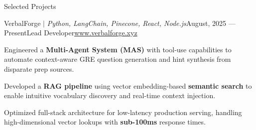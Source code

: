 \begin{rSection}{Selected Projects}

    \begin{rSubsection}{VerbalForge $|$ \emph{Python, LangChain, Pinecone, React, Node.js}}{August, 2025 --- Present}{Lead Developer}{\href{https://www.verbalforge.xyz}{www.verbalforge.xyz}}
        \item Engineered a \textbf{Multi-Agent System (MAS)} with tool-use capabilities to automate context-aware GRE question generation and hint synthesis from disparate prep sources.
        \item Developed a \textbf{RAG pipeline} using vector embedding-based \textbf{semantic search} to enable intuitive vocabulary discovery and real-time context injection.
        \item Optimized full-stack architecture for low-latency production serving, handling high-dimensional vector lookups with \textbf{sub-100ms} response times.
    \end{rSubsection}

\end{rSection}